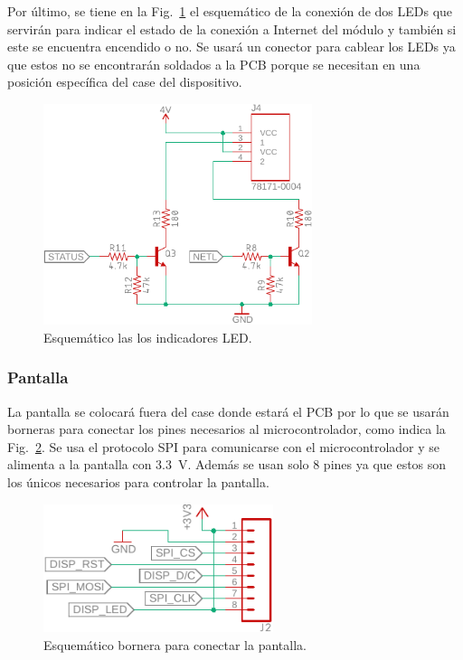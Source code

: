 Por último, se tiene en la Fig.~\ref{fig:GSM_LED_esquem} el esquemático de la conexión de dos LEDs que servirán para indicar el estado de la conexión a Internet del módulo y también si este se encuentra encendido o no. Se usará un conector para cablear los LEDs ya que estos no se encontrarán soldados a la PCB porque se necesitan en una posición específica del case del dispositivo.

\begin{figure}[htbp!]
\centering
\includegraphics[width=0.7\textwidth]{GSM_LED_esquem.pdf}
\caption{Esquemático las los indicadores LED.}
\label{fig:GSM_LED_esquem}
\end{figure}



\subsubsection{Pantalla}
La pantalla se colocará fuera del case donde estará el PCB por lo que se usarán borneras para conectar los pines necesarios al microcontrolador, como indica la Fig.~\ref{fig:DISPLAY_esquem}. Se usa el protocolo SPI para comunicarse con el microcontrolador y se alimenta a la pantalla con \SI{3.3}{V}. Además se usan solo 8 pines ya que estos son los únicos necesarios para controlar la pantalla.

\begin{figure}[htbp!]
\centering
\includegraphics[width=0.6\textwidth]{DISPLAY_esquem.pdf}
\caption{Esquemático bornera para conectar la pantalla.}
\label{fig:DISPLAY_esquem}
\end{figure}


